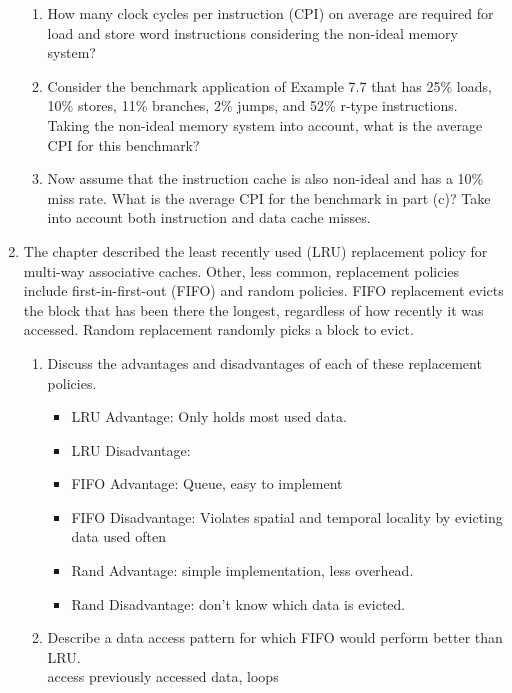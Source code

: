 \documentclass[a4paper]{article}
\begin{document}
\begin{enumerate}
\begin{enumerate}
				\item How many clock cycles per instruction (CPI) on average are required
					for load and store word instructions considering the non-ideal
					memory system?
				\item Consider the benchmark application of Example 7.7 that has 25\% loads,
					10\% stores, 11\% branches, 2\% jumps, and 52\% r-type instructions.
					Taking the non-ideal memory system into account, what is the average
					CPI for this benchmark?
				\item Now assume that the instruction cache is also non-ideal and has a 10\%
					miss rate. What is the average CPI for the benchmark in part (c)?
					Take into account both instruction and data cache misses.
			\end{enumerate}

		\item The chapter described the least recently used (LRU) replacement policy for multi-way
			associative caches. Other, less common, replacement policies include
			first-in-first-out (FIFO) and random policies. FIFO replacement evicts the block
			that has been there the longest, regardless of how recently it was accessed.
			Random replacement randomly picks a block to evict.
			\begin{enumerate}
				\item Discuss the advantages and disadvantages of each of these replacement
					policies.\\
					\begin{itemize}
						\item LRU Advantage: Only holds most used data.
						\item LRU Disadvantage: 
						\item FIFO Advantage: Queue, easy to implement
						\item FIFO Disadvantage: Violates spatial and temporal
							locality by evicting data used often
						\item Rand Advantage: simple implementation, less overhead.
						\item Rand Disadvantage: don't know which data is evicted.
					\end{itemize}
				\item Describe a data access pattern for which FIFO would perform better than
					LRU.\\
					access previously accessed data, loops 
			\end{enumerate}
	\end{enumerate}

	
\end{document}
